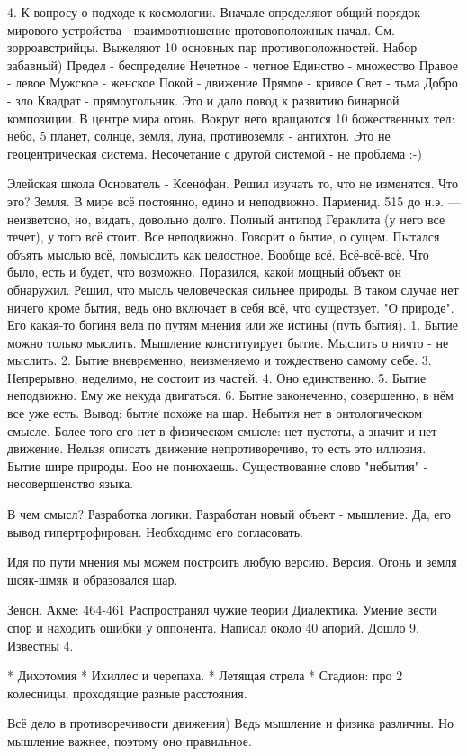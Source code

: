 4. К вопросу о подходе к космологии. Вначале определяют общий порядок мирового устройства - взаимоотношение протовоположных начал. См. зорроавстрийцы. Выжеляют 10 основных пар противоположностей. Набор забавный)
Предел - беспределие
Нечетное - четное
Единство - множество
Правое - левое
Мужское - женское
Покой - движение
Прямое - кривое
Свет - тьма
Добро - зло
Квадрат - прямоугольник.
Это и дало повод к развитию бинарной композиции.
В центре мира огонь. Вокруг него вращаются 10 божественных тел: небо, 5 планет, солнце, земля, луна, противоземля - антихтон. Это не геоцентрическая система. Несочетание с другой системой - не проблема :-)

Элейская школа
Основатель - Ксенофан. Решил изучать то, что не изменятся. Что это? Земля. В мире всё постоянно, едино и неподвижно. 
Парменид. 515 до н.э. --- неизветсно, но, видать, довольно долго. Полный антипод Гераклита (у него все течет), у того всё стоит. Все неподвижно. Говорит о бытие, о сущем. Пытался объять мыслью всё, помыслить как целостное. Вообще всё. Всё-всё-всё. Что было, есть и будет, что возможно. Поразился, какой мощный объект он обнаружил. Решил, что мысль человеческая сильнее природы. В таком случае нет ничего кроме бытия, ведь оно включает в себя всё, что существует. "О природе". Его какая-то богиня вела по путям мнения или же истины (путь бытия). 
1. Бытие можно только мыслить. Мышление конституирует бытие. Мыслить о ничто - не мыслить. 
2. Бытие вневременно, неизменяемо и тождествено самому себе. 
3. Непрерывно, неделимо, не состоит из частей. 4. Оно единственно. 5. Бытие неподвижно. Ему же некуда двигаться.
6. Бытие законеченно, совершенно, в нём все уже есть.
Вывод: бытие похоже на шар.
Небытия нет в онтологическом смысле. Более того его нет в физическом смысле: нет пустоты, а значит и нет движение. Нельзя описать движение непротиворечиво, то есть это иллюзия. 
Бытие шире природы. Еоо не понюхаешь.
Существование слово "небытия" - несовершенство языка.

В чем смысл? Разработка логики. Разработан новый объект - мышление. Да, его вывод гипертрофирован. Необходимо его согласовать.

Идя по пути мнения мы можем построить любую версию.
Версия. Огонь и земля шсяк-шмяк и образовался шар.

Зенон. Акме: 464-461 
Распространял чужие теории
Диалектика. Умение вести спор и находить ошибки у оппонента. Написал около 40 апорий. Дошло 9. Известны 4.

	* Дихотомия
	* Ихиллес и черепаха.
	* Летящая стрела
	* Стадион: про 2 колесницы, проходящие разные расстояния.

Всё дело в противоречивости движения)  Ведь мышление и физика различны. Но мышление важнее, поэтому оно правильное.
